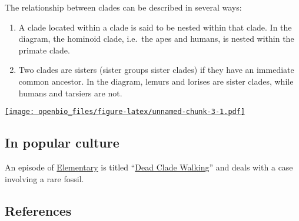 \documentclass[
]{book}
\providecommand{\tightlist}{%
  \setlength{\itemsep}{0pt}\setlength{\parskip}{0pt}}
\begin{document}
The relationship between clades can be described in several ways:

\begin{enumerate}
\def\labelenumi{\arabic{enumi}.}
\tightlist
\item
  A clade located within a clade is said to be nested within that clade. In the diagram, the hominoid clade, i.e.~the apes and humans, is nested within the primate clade.
\item
  Two clades are sisters (sister groups sister clades) if they have an immediate common ancestor. In the diagram, lemurs and lorises are sister clades, while humans and tarsiers are not.
\end{enumerate}

\href{https://upload.wikimedia.org/wikipedia/commons/thumb/5/5e/Primate_cladogram.svg/556px-Primate_cladogram.svg.png}{\texttt{[image: openbio\_files/figure-latex/unnamed-chunk-3-1.pdf]}}

\hypertarget{in-popular-culture}{%
\subsection{In popular culture}\label{in-popular-culture}}

An episode of \href{https://en.wikipedia.org/wiki/Elementary_(TV_series)}{Elementary} is titled ``\href{https://en.wikipedia.org/wiki/List_of_Elementary_episodes\#ep38}{Dead Clade Walking}'' and deals with a case involving a rare fossil.

\hypertarget{references-1}{%
\subsection{References}\label{references-1}}
\end{document}

